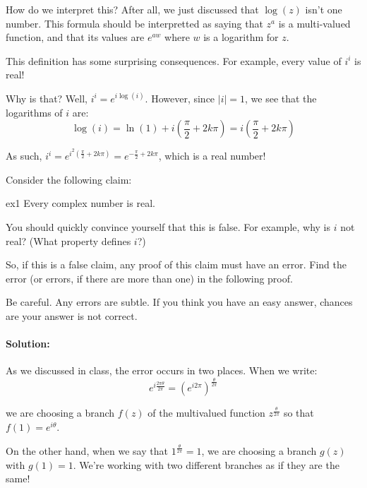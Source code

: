 How do we interpret this? After all, we just discussed that $\log(z)$ isn't one number. This formula should be interpretted as saying that $z^a$ is a multi-valued function, and that its values are $e^{aw}$ where $w$ is a logarithm for $z$.


\begin{ex}{}{} This definition has some surprising consequences. For example, every value of $i^i$ is real!

Why is that? Well, $i^i = e^{i\log(i)}$. However, since $|i| = 1$, we see that the logarithms of $i$ are:
$$\log(i) = \ln(1) + i\left(\frac{\pi}{2} + 2k\pi\right) = i\left(\frac{\pi}{2} + 2k\pi\right)$$

As such, $i^i = e^{i^2\left(\frac{\pi}{2} + 2k\pi\right)} = e^{-\frac{\pi}{2} + 2k\pi}$, which is a real number!\end{ex}

\begin{ex}{}{}Consider the following claim:

\begin{fthmbo}{}{ex1} Every complex number is real.\end{fthmbo}

You should quickly convince yourself that this is false. For example, why is $i$ not real? (What property defines $i$?)

So, if this is a false claim, any proof of this claim must have an error. Find the error (or errors, if there are more than one) in the following proof.


Be careful. Any errors are subtle. If you think you have an easy answer, chances are your answer is not correct.

\paragraph{Solution:} As we discussed in class, the error occurs in two places. When we write:
$$e^{i\frac{2\pi\theta}{2\pi}} = (e^{i2\pi})^{\frac{\theta}{2\pi}}$$


\noin we are choosing a branch $f(z)$ of the multivalued function $z^{\frac{\theta}{2\pi}}$ so that $f(1) = e^{i\theta}$.

On the other hand, when we say that $1^{\frac{\theta}{2\pi}} = 1$, we are choosing a branch $g(z)$ with $g(1) = 1$. We're working with two different branches as if they are the same!
\end{ex}

